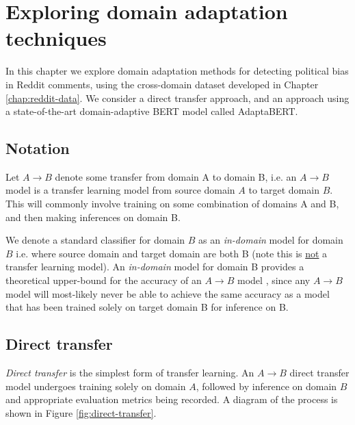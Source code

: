 \chapter{Exploring domain adaptation techniques} \label{chap:domain-adaptation}

In this chapter we explore domain adaptation methods for detecting political bias in Reddit comments, using the cross-domain dataset developed in Chapter \ref{chap:reddit-data}. We consider a direct transfer approach, and an approach using a state-of-the-art domain-adaptive BERT model called AdaptaBERT.

\section{Notation}

Let $ A \rightarrow B $ denote some transfer from domain A to domain B, i.e. an $ A \rightarrow B $ model is a transfer learning model from source domain $ A $ to target domain $ B $. This will commonly involve training on some combination of domains A and B, and then making inferences on domain B.

We denote a standard classifier for domain $ B $ as an \textit{in-domain} model for domain $ B $ i.e. where source domain and target domain are both B (note this is \underline{not} a transfer learning model). An \textit{in-domain} model for domain B provides a theoretical upper-bound for the accuracy of an $ A \rightarrow B $ model \cite{adaptabert}, since any $ A \rightarrow B $ model will most-likely never be able to achieve the same accuracy as a model that has been trained solely on target domain B for inference on B.

\section{Direct transfer} \label{sec:direct-transfer}

\textit{Direct transfer} is the simplest form of transfer learning. An $ A \rightarrow B $ direct transfer model undergoes training solely on domain $ A $, followed by inference on domain $ B $ and appropriate evaluation metrics being recorded. A diagram of the process is shown in Figure \ref{fig:direct-transfer}.

